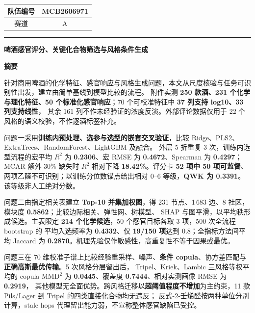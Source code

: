 \documentclass[UTF8,a4paper,zihao=-4]{ctexart}
\numberwithin{figure}{section}
\numberwithin{table}{section}
\numberwithin{equation}{section}
\begin{document}
\thispagestyle{empty}
\begin{center}
\begin{tabular}{|c|c|}
\hline
队伍编号 & MCB2606971 \\
\hline
赛道 & A \\
\hline
\end{tabular}
\end{center}
\vspace{0.8em}
\hrule
\vspace{0.8em}
\begin{center}
{\bfseries 啤酒感官评分、关键化合物筛选与风格条件生成}
\end{center}
\vspace{0.2em}
\begin{center}
\textbf{ 摘\quad 要}
\end{center}

针对商用啤酒的化学特征、感官响应与风格生成问题，本文从尺度核验与任务可识别性出发，建立由简单基线到模型比较的流程。
附件实测 \textbf{250 款酒、231 个化学与理化特征、50 个标准化感官响应}；70 个可校准特征中 \textbf{37 列支持 log10、33 列支持线性}，
其余 161 列不作未经验证的浓度反演。外部评论数据仅用于 22 个风格的语义校验，不作逐酒标签补充。

问题一采用\textbf{训练内预处理、选参与选型的嵌套交叉验证}，比较 Ridge、PLS2、ExtraTrees、RandomForest、LightGBM 及融合。
外层 5 折重复 3 次，训练内选型流程的宏平均 $R^2$ 为 \textbf{0.2306}、宏 RMSE 为 \textbf{0.4672}、Spearman 为 \textbf{0.4297}；MCAR 额外 30\% 缺失时 
$R^2$ 相对下降 \textbf{18.42\%}。评分卡 \textbf{52 项中 50 项可监督}、两项乙醛不可识别；以训练分位数锚点给出相对 0--6 等级，\textbf{QWK 为 0.3391}。
该等级非人工绝对分数。

问题二由指定相关表建立 \textbf{Top-10 并集加权图}，得 231 节点、1\,683 边、8 社区，模块度 \textbf{0.5862}；比较边际相关、弹性网、树模型、
SHAP 与图平滑，以平均秩形成候选。主表限定 \textbf{214 个化学候选}，50 个感官目标各取 3 项，500 次全流程 bootstrap 的
平均入选频率为 \textbf{0.4332}、仅 \textbf{19/150 项}达到 0.8；全指标方法间平均 Jaccard 为 \textbf{0.2870}。机理先验仅作敏感性，高重复性不等于因果或最优。

问题三在 70 维校准子谱上比较经验重采样、噪声、\textbf{条件 copula}、协方差匹配与\textbf{正确高斯最优传输}。5 次风格分层留出后，
Tripel、Kriek、Lambic 三风格等权平均的 copula $\mathrm{MMD}^2$ 为 \textbf{0.0445}、覆盖度 \textbf{0.7444}、相对实测画像 RMSE 为 \textbf{0.2919}，
其他模型无全面优势。跨风格迁移以\textbf{超阈值程度不增加}为主约束，11 款 Pils/Lager 到 Tripel 的四类直接化合物均无违反；
反式-2-壬烯醛按两种单位分别计算，stale hops 代理留出能力弱，不宣称整体感官缺陷已受控。
\end{document}
